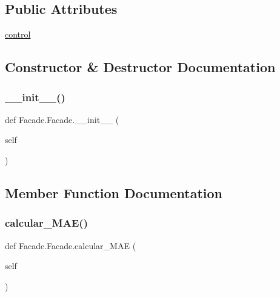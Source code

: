 \subsection*{Public Attributes}
\begin{DoxyCompactItemize}
\item 
\mbox{\hyperlink{class_facade_1_1_facade_a4ec08f6f7094ff267875a3abc6f0cb1b}{control}}
\end{DoxyCompactItemize}


\subsection{Constructor \& Destructor Documentation}
\mbox{\label{class_facade_1_1_facade_ad3ab1700c8824f9711bb33c34187f2b4}} 
\subsubsection{\texorpdfstring{\+\_\+\+\_\+init\+\_\+\+\_\+()}{\_\_init\_\_()}}
{\footnotesize\ttfamily def Facade.\+Facade.\+\_\+\+\_\+init\+\_\+\+\_\+ (\begin{DoxyParamCaption}\item[{}]{self }\end{DoxyParamCaption})}



\subsection{Member Function Documentation}
\mbox{\label{class_facade_1_1_facade_abb62f6ed9e166bc1041ad7a3c57c4d58}} 
\subsubsection{\texorpdfstring{calcular\+\_\+\+M\+A\+E()}{calcular\_MAE()}}
{\footnotesize\ttfamily def Facade.\+Facade.\+calcular\+\_\+\+M\+AE (\begin{DoxyParamCaption}\item[{}]{self }\end{DoxyParamCaption})}

